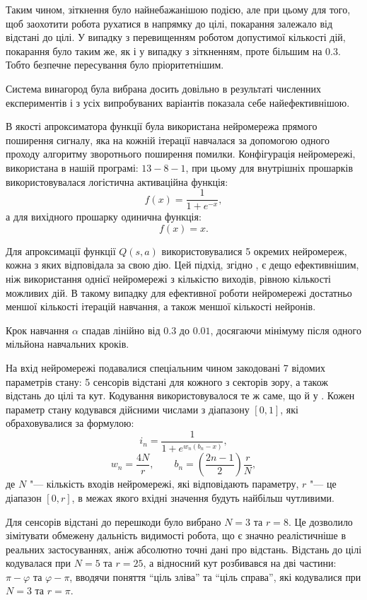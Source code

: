 \documentclass[a4paper,10pt,fleqn]{article}
\begin{document}
Таким чином, зіткнення було найнебажанішою подією, але при цьому для того, щоб заохотити робота рухатися в напрямку до цілі, покарання залежало від відстані до цілі. У випадку з перевищенням роботом допустимої кількості дій, покарання було таким же, як і у випадку з зіткненням, проте більшим на $0.3$. Тобто безпечне пересування було пріоритетнішим.

Система винагород була вибрана досить довільно в результаті численних експериментів і з усіх випробуваних варіантів показала себе найефективнішою.

В якості апроксиматора функції була використана нейромережа прямого поширення сигналу, яка на кожній ітерації навчалася за допомогою одного проходу алгоритму зворотнього поширення помилки. Конфігурація нейромережі, використана в нашій програмі: $13-8-1$, при цьому для внутрішніх прошарків використовувалася логістична активаційна функція:
\[
    f(x) = \frac{1}{1 + e^{-x}},
\]
а для вихідного прошарку одинична функція:
\[
    f(x) = x.
\]

Для апроксимації функції $Q(s,a)$ використовувалися 5 окремих нейромереж, кожна з яких відповідала за свою дію. Цей підхід, згідно \cite{Rummery1995}, є дещо ефективнішим, ніж використання однієї нейромережі з кількістю виходів, рівною кількості можливих дій. В такому випадку для ефективної роботи нейромережі достатньо меншої кількості ітерацій навчання, а також меншої кількості нейронів.

Крок навчання $\alpha$ спадав лінійно від $0.3$ до $0.01$, досягаючи мінімуму після одного мільйона навчальних кроків.

На вхід нейромережі подавалися спеціальним чином закодовані 7 відомих параметрів стану: 5 сенсорів відстані для кожного з секторів зору, а також відстань до цілі та кут. Кодування використовувалося те ж саме, що й у \cite{Rummery1995}. Кожен параметр стану кодувався дійсними числами з діапазону $[0,1]$, які обраховувалися за формулою:
\[
    i_n = \frac{1}{1 + e^{w_n(b_n-x)}},
\]
\[
    w_n = \frac{4N}{r},\qquad b_n = \left(\frac{2n-1}{2}\right)\frac{r}{N},
\]
де $N$ "--- кількість входів нейромережі, які відповідають параметру, $r$ "--- це діапазон $[0,r]$, в межах якого вхідні значення будуть найбільш чутливими.

Для сенсорів відстані до перешкоди було вибрано $N = 3$ та $r = 8$. Це дозволило зімітувати обмежену дальність видимості робота, що є значно реалістичніше в реальних застосуваннях, аніж абсолютно точні дані про відстань. Відстань до цілі кодувалася при $N = 5$ та $r = 25$, а відносний кут розбивався на дві частини: $\pi - \varphi$ та $\varphi - \pi$, вводячи поняття ``ціль зліва'' та ``ціль справа'', які кодувалися при $N = 3$ та $r = \pi$.
\end{document}
